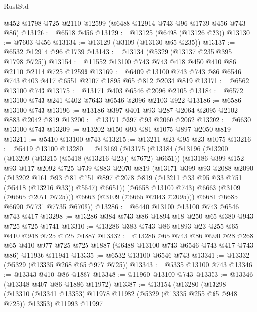 \begin{lexlean}{RustStd}
\begin{coremodule}
    @452
    @1798
    @725
    @2110
    @12599
    (@6488 @12914 @743 @96 @1739 @456 @743 @86)
@13126 := @6518 @456
@13129 := @13125 (@6498 (@13126 @23))
@13130 := @7603 @456
@13134 := @13129 (@3109 (@13130 @65 @235))
@13137 := @6532 @12914 @96 @1739
@13143 := @13134 (@5329 (@13137 @235 @395 @1798 @725))
@13154 := @11552 @13100 @743 @743 @418 @450 @410 @86 @2110 @2114 @725 @12599
@13169 := @6409 @13100 @743 @743 @86 @6546 @743 @403 @417 @6551 @2107 @1895 @65 @812 @2034 @819
@13171 := @6562 @13100 @743
@13175 := @13171 @403 @6546 @2096 @2105
@13184 := @6572 @13100 @743 @241 @402 @7643 @6546 @2096 @2103 @922
@13186 := @6586 @13100 @743
@13196 := @13186 @397 @401 @93 @287 @2064 @2095 @2102 @883 @2042 @819
@13200 := @13171 @397 @93 @2060 @2062
@13202 := @6630 @13100 @743
@13209 := @13202 @150 @93 @81 @1075 @897 @2050 @819
@13211 := @5410 @13100 @743
@13215 := @13211 @23 @95 @23 @1075
@13216 := @5419 @13100
@13280 := @13169
    (@13175
      (@13184
        (@13196
          (@13200 (@13209 (@13215 (@5418 (@13216 @23)) @7672) @6651))
          (@13186
            @399
            @152
            @93
            @117
            @2092
            @725
            @739
            @883
            @2070
            @819
            (@13171
              @399
              @93
              @2088
              @2090
              (@13202
                @161
                @93
                @81
                @751
                @897
                @2078
                @819
                (@13211 @33 @95 @33 @751 (@5418 (@13216 @33)) @5547)
                @6651))
            (@6658 @13100 @743)
            @6663
            (@3109 (@6665 @2071 @725)))
          @6663
          (@3109 (@6665 @2043 @2095)))
        @6681
        @6685
        @6690
        @7731
        @7735
        @6708))
@13286 := @6440 @13100 @13100 @743 @6546 @743 @417
@13298 := @13286 @384 @743 @86 @1894 @18 @250 @65 @380 @943 @725 @725 @1741
@13310 := @13286 @383 @743 @86 @1893 @23 @255 @65 @410 @948 @725 @725 @1887
@13332 := @13286
    @65
    @743
    @86
    @990
    @28
    @268
    @65
    @410
    @977
    @725
    @725
    @1887
    (@6488 @13100 @743 @6546 @743 @417 @743 @86)
    @11936
    @11941
@13335 := @6532 @13100 @6546 @743
@13341 := @13332 (@5329 (@13335 @268 @65 @977 @725))
@13343 := @5335 @13100 @743
@13346 := @13343 @410 @86 @1887
@13348 := @11960 @13100 @743
@13353 := @13346 (@13348 @407 @86 @1886 @11972)
@13387 := @13154
    (@13280
      (@13298
        (@13310 (@13341 @13353) @11978 @11982 (@5329 (@13335 @255 @65 @948 @725)) @13353)
        @11993
        @11997

\end{coremodule}
\end{lexlean}
